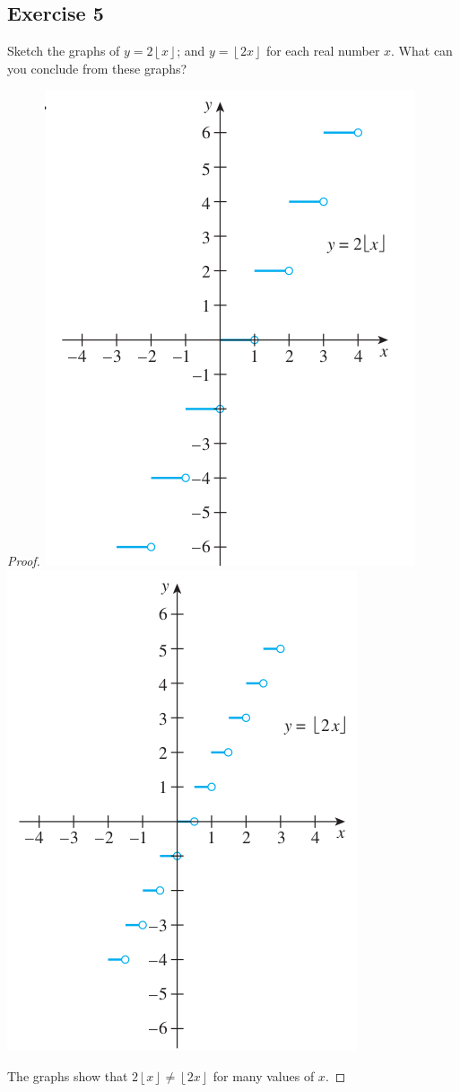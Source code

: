 \documentclass[14pt]{extarticle}
\newcommand{\floor}[1]{{\left\lfloor#1\right\rfloor}}
\begin{document}
\subsection{Exercise 5}
Sketch the graphs of \(y = 2\floor{x}\); and \(y = \floor{2x}\) for each real number \(x\). What can you conclude from
these graphs?

\begin{proof}
    \includegraphics[scale=0.5]{../images/11.1.5.a.png}
    \includegraphics[scale=0.5]{../images/11.1.5.b.png}

    The graphs show that \(2\floor{x} \neq \floor{2x}\) for many values of \(x\).
\end{proof}
\end{document}
